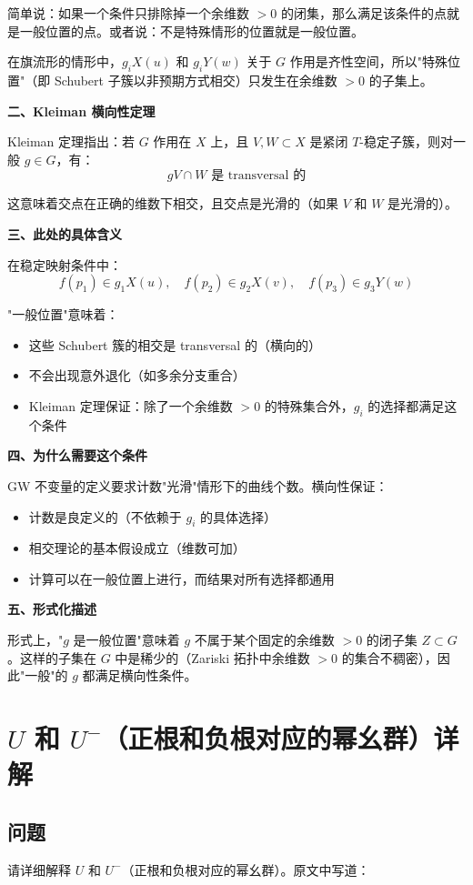 简单说：如果一个条件只排除掉一个余维数 $> 0$ 的闭集，那么满足该条件的点就是一般位置的点。或者说：不是特殊情形的位置就是一般位置。

在旗流形的情形中，$g_i X(u)$ 和 $g_i Y(w)$ 关于 $G$ 作用是齐性空间，所以"特殊位置"（即 Schubert 子簇以非预期方式相交）只发生在余维数 $> 0$ 的子集上。

\textbf{二、Kleiman 横向性定理}

Kleiman 定理指出：若 $G$ 作用在 $X$ 上，且 $V, W \subset X$ 是紧闭 $T$-稳定子簇，则对一般 $g \in G$，有：
$$gV \cap W \text{ 是 transversal 的}$$

这意味着交点在正确的维数下相交，且交点是光滑的（如果 $V$ 和 $W$ 是光滑的）。

\textbf{三、此处的具体含义}

在稳定映射条件中：
$$f(p_1) \in g_1 X(u),\quad f(p_2) \in g_2 X(v),\quad f(p_3) \in g_3 Y(w)$$

"一般位置"意味着：
\begin{itemize}
\item 这些 Schubert 簇的相交是 transversal 的（横向的）
\item 不会出现意外退化（如多余分支重合）
\item Kleiman 定理保证：除了一个余维数 $> 0$ 的特殊集合外，$g_i$ 的选择都满足这个条件
\end{itemize}

\textbf{四、为什么需要这个条件}

GW 不变量的定义要求计数"光滑"情形下的曲线个数。横向性保证：
\begin{itemize}
\item 计数是良定义的（不依赖于 $g_i$ 的具体选择）
\item 相交理论的基本假设成立（维数可加）
\item 计算可以在一般位置上进行，而结果对所有选择都通用
\end{itemize}

\textbf{五、形式化描述}

形式上，"$g$ 是一般位置"意味着 $g$ 不属于某个固定的余维数 $> 0$ 的闭子集 $Z \subset G$。这样的子集在 $G$ 中是稀少的（Zariski 拓扑中余维数 $> 0$ 的集合不稠密），因此"一般"的 $g$ 都满足横向性条件。

\section{$U$ 和 $U^-$（正根和负根对应的幂幺群）详解}\label{sec:qa-U-and-Uminus-concrete}
\subsection{问题}
请详细解释 $U$ 和 $U^-$（正根和负根对应的幂幺群）。原文中写道：

